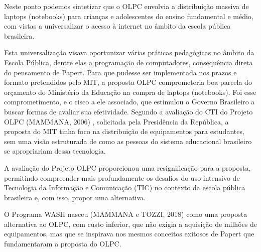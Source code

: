 \documentclass[
12pt,		%
openright,	%
twoside,  %
a4paper,			%
chapter=TITLE,		%
english,			%
french,				%
spanish,			%
brazil				%
]{USPSC-classe/USPSC}
\begin{document}
Neste ponto podemos sintetizar que o OLPC envolvia a distribui\c{c}\~ao massiva de laptops (notebooks) para crian\c{c}as e adolescentes do  ensino fundamental e m\'edio, com vistas a universalizar o acesso \`a internet no \^ambito da escola p\'ublica brasileira.

















Esta universaliza\c{c}\~ao visava oportunizar v\'arias pr\'aticas pedag\'ogicas no \^ambito da Escola P\'ublica, dentre elas a programa\c{c}\~ao de computadores, consequ\^encia direta do pensamento de Papert. Para que pudesse ser implementada nos prazos e formato pretendidos pelo MIT, a proposta OLPC comprometeria boa parcela do or\c{c}amento do Minist\'erio da Educa\c{c}\~ao na compra de laptops (notebooks). Foi esse comprometimento, e o risco a ele associado, que estimulou o Governo Brasileiro a buscar formas de avaliar sua efetividade. Segundo a avalia\c{c}\~ao do CTI do Projeto OLPC  (MAMMANA, 2006) , solicitada pela Presid\^encia da Rep\'ublica, a proposta do MIT tinha foco na distribui\c{c}\~ao de equipamentos para estudantes, sem uma vis\~ao estruturada de como as pessoas do sistema educacional brasileiro se apropriariam dessa tecnologia.

















A avalia\c{c}\~ao do Projeto OLPC proporcionou uma resignifica\c{c}\~ao para a proposta, permitindo compreender mais profundamente os desafios do uso intensivo de Tecnologia da Informa\c{c}\~ao e Comunica\c{c}\~ao (TIC) no contexto da escola p\'ublica brasileira e, com isso, propor uma alternativa.

















O Programa WASH nasceu  (MAMMANA e TOZZI, 2018)  como uma proposta alternativa ao OLPC, com custo inferior, que n\~ao exigia a aquisi\c{c}\~ao de milh\~oes de equipamentos, mas que se inspirava nos mesmos conceitos exitosos de Papert que fundamentaram a proposta do OLPC.
\end{document}

